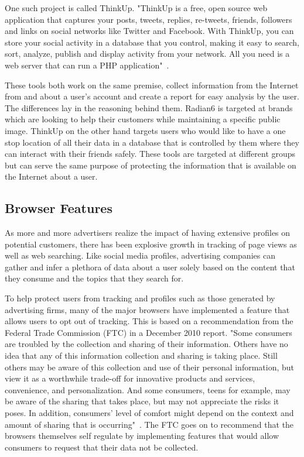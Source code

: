 One such project is called ThinkUp. "ThinkUp is a free, open source web
application that captures your posts, tweets, replies, re-tweets, friends,
followers and links on social networks like Twitter and Facebook. With ThinkUp,
you can store your social activity in a database that you control, making it
easy to search, sort, analyze, publish and display activity from your network.
All you need is a web server that can run a PHP application"~\cite{thinkup}.

These tools both work on the same premise, collect information from the Internet
from and about a user's account and create a report for easy
analysis by the user. The differences lay in the reasoning behind them. Radian6
is targeted at brands which are looking to help their customers while
maintaining a specific public image. ThinkUp on the other hand targets
users who would like to have a one stop location of all their data in a database
that is controlled by them where they can interact with their friends safely.
These tools are targeted at different groups but can serve the same purpose of
protecting the information that is available on the Internet about a user.

\subsection{Browser Features}
As more and more advertisers realize the impact of having extensive profiles on
potential customers, there has been explosive growth in tracking of page views
as well as web searching. Like social media profiles, advertising companies can
gather and infer a plethora of data about a user solely based on the content
that they consume and the topics that they search for. 

To help protect users from tracking and profiles such as those generated by
advertising firms, many of the major browsers have implemented a feature that
allows users to opt out of tracking.  This is based on a recommendation from the
Federal Trade Commission (FTC) in a December 2010 report. "Some consumers are troubled by the collection
and sharing of their information.  Others have no idea that any of this
information collection and sharing is taking place. Still others may be aware of
this collection and use of their personal information, but view it as a
worthwhile trade-off for innovative products and services, convenience, and
personalization. And some consumers, teens for example, may be aware of
the sharing that takes place, but may not appreciate the risks it poses. In
addition, consumers’ level of comfort might depend on the context and amount of
sharing that is occurring"~\cite{ftc}. The FTC goes
on to recommend that the browsers themselves self regulate by implementing
features that would allow consumers to request that their data not be collected.

